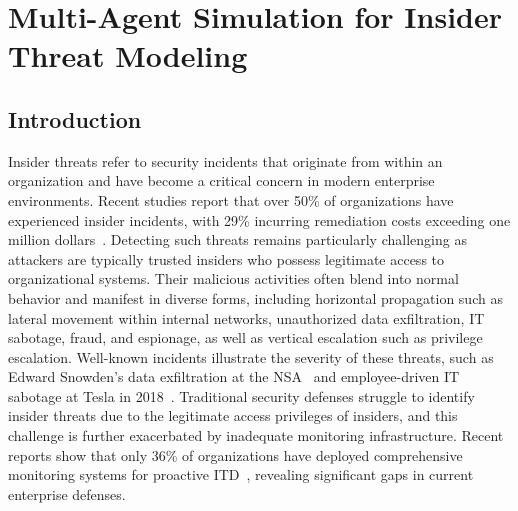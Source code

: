 \chapter{Multi-Agent Simulation for Insider Threat Modeling}

\section{Introduction}

Insider threats refer to security incidents that originate from within an organization and have become a critical concern in modern enterprise environments. Recent studies report that over 50\% of organizations have experienced insider incidents, with 29\% incurring remediation costs exceeding one million dollars~\cite{ponemon2025insider,gurucul2024insider}. Detecting such threats remains particularly challenging as attackers are typically trusted insiders who possess legitimate access to organizational systems. Their malicious activities often blend into normal behavior and manifest in diverse forms, including horizontal propagation such as lateral movement within internal networks, unauthorized data exfiltration, IT sabotage, fraud, and espionage, as well as vertical escalation such as privilege escalation. Well-known incidents illustrate the severity of these threats, such as Edward Snowden's data exfiltration at the NSA~\cite{harding2014snowden} and employee-driven IT sabotage at Tesla in 2018~\cite{agnihotri2024tesla}. Traditional security defenses struggle to identify insider threats due to the legitimate access privileges of insiders, and this challenge is further exacerbated by inadequate monitoring infrastructure. Recent reports show that only 36\% of organizations have deployed comprehensive monitoring systems for proactive ITD~\cite{gurucul2024insider,signpost2025insider}, revealing significant gaps in current enterprise defenses.